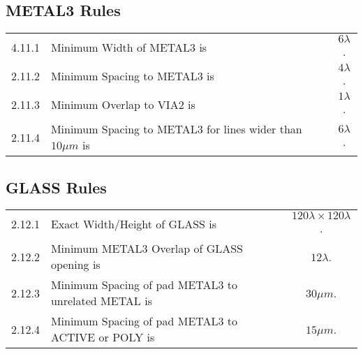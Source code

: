 \subsection{METAL3 Rules}\label{design_rules_metal3_rules}

\begin{center}
\end{center}

\begin{flushleft}
    \begin{tabular}{c l c}
        4.11.1  & Minimum Width of METAL3 is & $6 \lambda$. \\
        2.11.2  & Minimum Spacing to METAL3 is & $4 \lambda$. \\
        2.11.3  & Minimum Overlap to VIA2 is & $1 \lambda$. \\
        2.11.4  & Minimum Spacing to METAL3 for lines wider than $10 \mu m$ is & $6 \lambda$. \\
    \end{tabular}
\end{flushleft}

\subsection{GLASS Rules}\label{design_rules_glass_rules}

\begin{flushleft}
    \begin{tabular}{c l c}
	2.12.1  & Exact Width/Height of GLASS is & $ 120 \lambda \times 120 \lambda$. \\
        2.12.2  & Minimum METAL3 Overlap of GLASS opening is & $ 12 \lambda $. \\
        2.12.3  & Minimum Spacing of pad METAL3 to unrelated METAL is & $30 \mu m$. \\
        2.12.4  & Minimum Spacing of pad METAL3 to ACTIVE or POLY is & $15 \mu m$. \\
    \end{tabular}
\end{flushleft}


